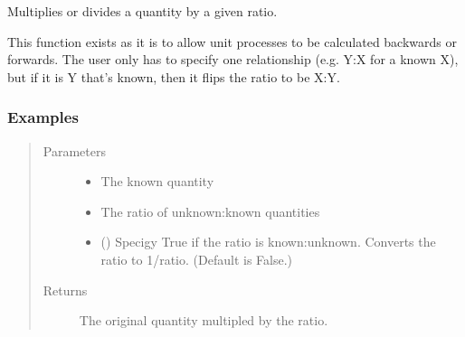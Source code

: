 \documentclass[a4paper,10pt,english]{sphinxmanual}
\begin{document}

\begin{fulllineitems}
\label{\detokenize{calculators:calculators.Ratio}}
Multiplies or divides a quantity by a given ratio.

This function exists as it is to allow unit processes to be calculated
backwards or forwards. The user only has to specify one relationship
(e.g. Y:X for a known X), but if it is Y that’s known, then it flips
the ratio to be X:Y.
\subsubsection*{Examples}

\begin{sphinxVerbatim}[commandchars=\\\{\}]
 
\end{sphinxVerbatim}

\begin{sphinxVerbatim}[commandchars=\\\{\}]
  
\end{sphinxVerbatim}
\begin{quote}\begin{description}
\item[{Parameters}] \leavevmode\begin{itemize}
\item {} 
 \textendash{} The known quantity

\item {} 
 \textendash{} The ratio of unknown:known quantities

\item {} 
 () \textendash{} Specigy True if the ratio is known:unknown. Converts the
ratio to 1/ratio.
(Default is False.)

\end{itemize}

\item[{Returns}] \leavevmode
The original quantity multipled by the ratio.

\end{description}\end{quote}

\end{fulllineitems}
\end{document}
